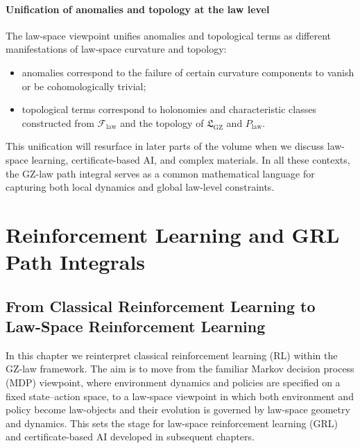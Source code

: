 \documentclass[11pt]{book}
\newcommand{\GZLS}{\ensuremath{\mathfrak{L}_{\mathrm{GZ}}}}
\newcommand{\GZLCurv}{\ensuremath{\mathcal{F}_{\mathrm{law}}}}
\newcommand{\Bundle}{\ensuremath{P}}
\theoremstyle{plain}
\theoremstyle{definition}
\theoremstyle{remark}
\begin{document}
\subsection{Unification of anomalies and topology at the law level}

The law-space viewpoint unifies anomalies and topological terms as
different manifestations of law-space curvature and topology:
\begin{itemize}
  \item anomalies correspond to the failure of certain curvature
        components to vanish or be cohomologically trivial;
  \item topological terms correspond to holonomies and characteristic
        classes constructed from $\GZLCurv$ and the topology of
        $\GZLS$ and $\Bundle_{\mathrm{law}}$.
\end{itemize}

This unification will resurface in later parts of the volume when we
discuss law-space learning, certificate-based AI, and complex
materials. In all these contexts, the GZ-law path integral serves as a
common mathematical language for capturing both local dynamics and
global law-level constraints.





\part[Reinforcement Learning and GRL Path Integrals]{Reinforcement Learning and GRL Path Integrals}

\chapter[From Classical RL to Law-Space Reinforcement Learning]{From Classical Reinforcement Learning to Law-Space Reinforcement Learning}
\label{chap:rl-to-lawspace}


In this chapter we reinterpret classical reinforcement learning (RL)
within the GZ-law framework. The aim is to move from the familiar
Markov decision process (MDP) viewpoint, where environment dynamics
and policies are specified on a fixed state--action space, to a
law-space viewpoint in which both environment and policy become
law-objects and their evolution is governed by law-space geometry
and dynamics. This sets the stage for law-space reinforcement
learning (GRL) and certificate-based AI developed in subsequent
chapters.
\end{document}
